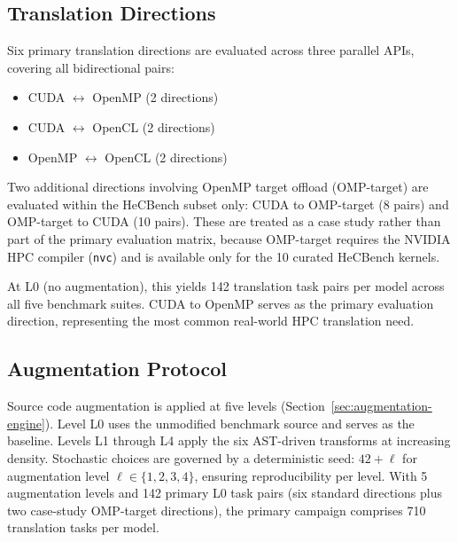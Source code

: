 \documentclass[conference]{IEEEtran}
\begin{document}
\subsection{Translation Directions}
\label{sec:directions}

Six primary translation directions are evaluated across three parallel APIs, covering all bidirectional pairs:

\begin{itemize}
\item CUDA $\leftrightarrow$ OpenMP (2 directions)
\item CUDA $\leftrightarrow$ OpenCL (2 directions)
\item OpenMP $\leftrightarrow$ OpenCL (2 directions)
\end{itemize}

Two additional directions involving OpenMP target offload (OMP-target) are evaluated within the HeCBench subset only: CUDA to OMP-target (8 pairs) and OMP-target to CUDA (10 pairs). These are treated as a case study rather than part of the primary evaluation matrix, because OMP-target requires the NVIDIA HPC compiler (\texttt{nvc}) and is available only for the 10 curated HeCBench kernels.

At L0 (no augmentation), this yields 142 translation task pairs per model across all five benchmark suites. CUDA to OpenMP serves as the primary evaluation direction, representing the most common real-world HPC translation need.

\subsection{Augmentation Protocol}
\label{sec:augmentation-protocol}

Source code augmentation is applied at five levels (Section~\ref{sec:augmentation-engine}). Level L0 uses the unmodified benchmark source and serves as the baseline. Levels L1 through L4 apply the six AST-driven transforms at increasing density. Stochastic choices are governed by a deterministic seed: $42 + \ell$ for augmentation level $\ell \in \{1,2,3,4\}$, ensuring reproducibility per level. With 5 augmentation levels and 142 primary L0 task pairs (six standard directions plus two case-study OMP-target directions), the primary campaign comprises 710 translation tasks per model.
\end{document}
